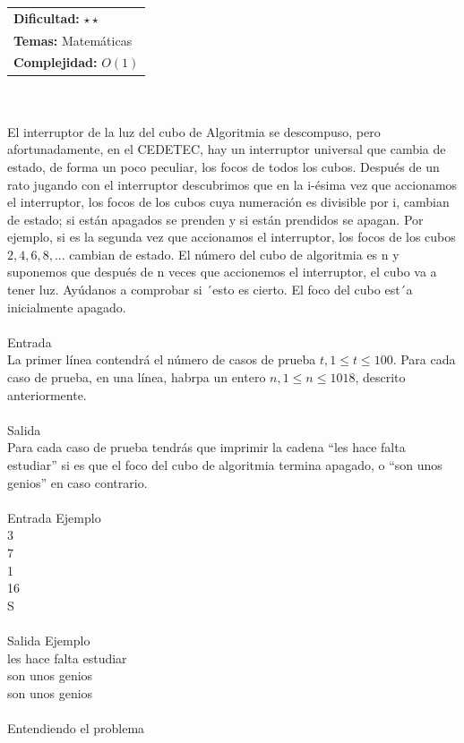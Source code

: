 \documentclass[12pt]{article}
\begin{document}
{{{\hfill
\begin{tabular}{@{}l@{}}
\textbf{Dificultad:} $\star \star$ \\
\textbf{Temas:} Matemáticas \\
\textbf{Complejidad:} $O(1)$
\end{tabular}\\
\\
El interruptor de la luz del cubo de Algoritmia se descompuso, pero afortunadamente, en el CEDETEC, hay un interruptor universal que cambia de estado, de forma un poco peculiar, los focos de todos los cubos. Después de un rato jugando con el interruptor descubrimos que en la i-ésima vez que accionamos el interruptor, los focos de los cubos cuya numeración es divisible por i, cambian de estado; si están apagados se prenden y si están prendidos
se apagan. Por ejemplo, si es la segunda vez que accionamos el interruptor, los focos de los cubos $2, 4, 6, 8, ...$ cambian de estado. El número del cubo de algoritmia es n y suponemos que después de n veces que accionemos el interruptor, el cubo va a tener luz. Ayúdanos a comprobar si ´esto es cierto. El foco del cubo est´a inicialmente
apagado.
\\
\\
\textrm{\large Entrada}
\\
La primer línea contendrá el número de casos de prueba $t, 1 ≤ t ≤ 100$. Para cada caso de prueba, en una línea, habrpa un entero $n, 1 ≤ n ≤ 1018$, descrito anteriormente.
\\
\\
\textrm{\large Salida}
\\
Para cada caso de prueba tendrás que imprimir la cadena “les hace falta estudiar” si es que el foco del cubo de algoritmia termina apagado, o “son unos genios” en caso contrario.
\\
\\
\textrm{\large Entrada Ejemplo}
\\
3\\
7\\
1\\
16\\
S\\
\\
\textrm{\large Salida Ejemplo}
\\
les hace falta estudiar\\
son unos genios\\
son unos genios\\
\\
\textrm{\large Entendiendo el problema}\\
}}}
\end{document}
